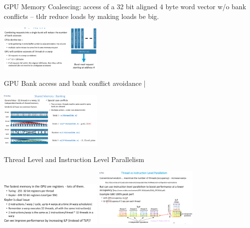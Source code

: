 \documentclass[letter,8pt,landscape]{article}
\begin{document}
\begin{multicols}{3}
  GPU Memory Coalescing: access of a 32 bit aligned 4 byte word vector w/o bank
  conflicts -- tldr reduce loads by making loads be big.
  \begin{center}
    \includegraphics[width=2in]{images/coalescing.jpg}
  \end{center}

  GPU Bank access and bank conflict avoidance |
  \begin{center}
    \includegraphics[width=2in]{images/banks.jpg}
  \end{center}
  
  Thread Level and Instruction Level Parallelism
  \begin{center}
    \includegraphics[width=2in]{images/gpu-ilp.jpg}
    \includegraphics[width=2in]{images/gpu-tlp-ilp.jpg}
  \end{center}
  




\end{multicols}
\end{document}

